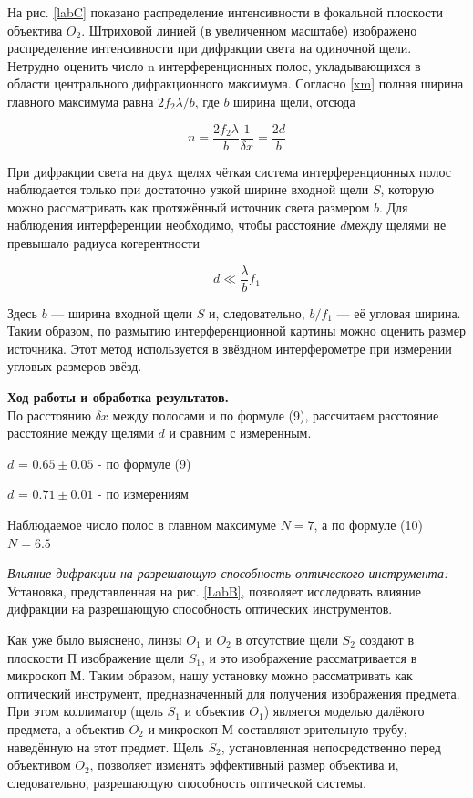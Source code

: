 \documentclass[a4paper, 12pt]{article}%
\newcommand{\RomanNumeralCaps}[1]{\uppercase\expandafter{\romannumeral#1}}
\begin{document}
На рис. \ref{labC} показано распределение интенсивности в фокальной плоскости объектива $ O_2 $. Штриховой линией (в увеличенном масштабе)
изображено распределение интенсивности при дифракции света на одиночной щели. Нетрудно оценить число n интерференционных полос,
укладывающихся в области центрального дифракционного максимума.
Согласно \eqref{xm} полная ширина главного максимума равна $ 2 f_2 \lambda /b $, где $ b $ ширина щели, отсюда

\begin{equation}\label{n}
	n = \dfrac{2f_2 \lambda}{b} \dfrac{1}{\delta x} = \dfrac{2d}{b}
\end{equation}

При дифракции света на двух щелях чёткая система интерференционных полос наблюдается только при достаточно узкой ширине входной щели $ S $, которую можно рассматривать как протяжённый источник света размером $ b $. Для наблюдения интерференции необходимо, чтобы расстояние $ d $между щелями не превышало радиуса когерентности

\begin{equation}\label{}
	d \ll \dfrac{\lambda}{b} f_1
\end{equation}

Здесь $ b $ --- ширина входной щели $ S $ и, следовательно, $  b/f_1 $ --- её угловая ширина. Таким образом, по размытию интерференционной картины можно оценить размер источника. Этот метод используется в звёздном интерферометре при измерении угловых размеров звёзд.

\textbf{Ход работы и обработка результатов.}\\

По расстоянию $\delta x$ между полосами и по формуле (9), рассчитаем расстояние расстояние между щелями $d$ и сравним с измеренным.

$d$ = $0.65 \pm 0.05$ - по формуле (9)

$d$ = $0.71 \pm 0.01$ - по измерениям


Наблюдаемое число полос в главном максимуме $N = 7$, а по формуле (10) $N = 6.5$

\RomanNumeralCaps 4 \textit{Влияние дифракции на разрешающую способность оптического инструмента:}\\

Установка, представленная на рис. \ref{LabB}, позволяет исследовать влияние дифракции на разрешающую способность оптических инструментов.

Как уже было выяснено, линзы $O_1$ и $ O_2$ в отсутствие щели $S_2$ создают в плоскости П изображение щели $S_1$, и это изображение рассматривается в микроскоп М. Таким образом, нашу установку можно рассматривать как оптический инструмент, предназначенный для получения изображения предмета. При этом коллиматор (щель $S_1$ и объектив $O_1$) является моделью далёкого предмета, а объектив $O_2$ и микроскоп М составляют зрительную трубу, наведённую на этот предмет.
Щель $S_2$, установленная непосредственно перед объективом $O_2$, позволяет изменять эффективный размер объектива и, следовательно, разрешающую способность оптической системы.
\end{document}
